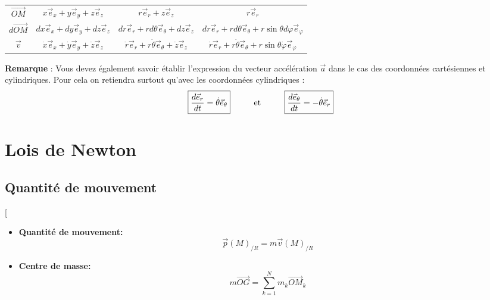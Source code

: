 \documentclass[12pt,hidelinks]{article}
\begin{document}
\begin{table}[!h]
\begin{center}
\begin{adjustwidth}{-1cm}{}
\begin{tabular}{|c|c|c|c|}
        \multirow{2}{*}{$\overrightarrow{OM}$}&\multirow{2}{*}{$x\vec e_x+y\vec e_y+z\vec e_z$} &\multirow{2}{*}{$r\vec e_r+z\vec e_z$}&\multirow{2}{*}{$r\vec e_r$}\\
        &&&
        \\ \hline
        \multirow{2}{*}{$d\overrightarrow{OM}$}&\multirow{2}{*}{$d x\vec e_x+d y\vec e_y+d z\vec e_z$}&\multirow{2}{*}{$d r\vec e_r+r d \theta\vec e_\theta+d z\vec e_z$}&\multirow{2}{*}{$d r\vec e_r+rd \theta\vec e_\theta+r\sin\theta d \varphi \vec e_\varphi$}\\
        &&&
        \\ \hline
        \multirow{2}{*}{$\overrightarrow{v}$}&\multirow{2}{*}{$\dot x\vec e_x+\dot y\vec e_y+\dot z\vec e_z$}&\multirow{2}{*}{$\dot r \vec e_r+r\dot \theta \vec e_\theta+\dot z\vec e_z$}&\multirow{2}{*}{$\dot r\vec e_r+r\dot \theta\vec e_\theta+r\sin\theta\dot \varphi \vec e_\varphi$}\\
        &&&
        \\ \hline


        \end{tabular}
        \end{adjustwidth}
        \end{center}
        \label{default}
        \end{table}%


        \vspace{-0.7  cm}

        \textbf{Remarque} : Vous devez également savoir établir l'expression du vecteur accélération $\vec a$ dans le cas des coordonnées cartésiennes et cylindriques. Pour cela on retiendra surtout qu'avec les coordonnées cylindriques : \[\fbox{$\dfrac{d \vec e_r}{d t}=\dot \theta \vec e_\theta$} \hspace{1cm} \mathrm{et} \hspace{1cm} \fbox{$\dfrac{d \vec e_\theta}{d t}=-\dot \theta \vec e_r$}\]
    
\newpage
\section{Lois de Newton}
\vspace{3cm}
    \subsection{Quantité de mouvement}
        \begin{DashedDefinition}{}[
            \begin{itemize}
                \item \textbf{Quantité de mouvement:} \[\vec p (M)_{/R}=m \vec v (M)_{/R}\]
                \item \textbf{Centre de masse:} \[m \overrightarrow{OG}=\sum_{k=1}^N m_k \overrightarrow{OM}_k\]
            \end{itemize}
        \end{DashedDefinition}
\end{document}
